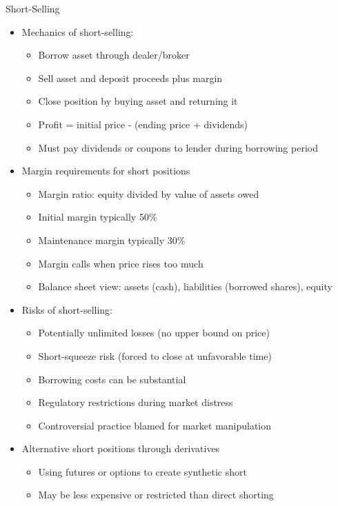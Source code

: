 \documentclass[10pt,handout]{beamer}
\begin{document}
\begin{frame}{Short-Selling}
  \begin{itemize}[<+->]
    \item Mechanics of short-selling:
      \begin{itemize}
        \item Borrow asset through dealer/broker
        \item Sell asset and deposit proceeds plus margin
        \item Close position by buying asset and returning it
        \item Profit = initial price - (ending price + dividends)
        \item Must pay dividends or coupons to lender during borrowing period
      \end{itemize}
    \item Margin requirements for short positions
      \begin{itemize}
        \item Margin ratio: equity divided by value of assets owed
        \item Initial margin typically 50\%
        \item Maintenance margin typically 30\%
        \item Margin calls when price rises too much
        \item Balance sheet view: assets (cash), liabilities (borrowed shares), equity
      \end{itemize}
    \item Risks of short-selling:
      \begin{itemize}
        \item Potentially unlimited losses (no upper bound on price)
        \item Short-squeeze risk (forced to close at unfavorable time)
        \item Borrowing costs can be substantial
        \item Regulatory restrictions during market distress
        \item Controversial practice blamed for market manipulation
      \end{itemize}
    \item Alternative short positions through derivatives
      \begin{itemize}
        \item Using futures or options to create synthetic short
        \item May be less expensive or restricted than direct shorting
      \end{itemize}
  \end{itemize}
\end{frame}
\end{document}
